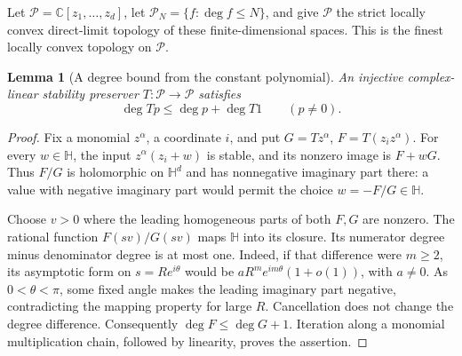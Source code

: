 \documentclass[reqno]{amsart}
\newtheorem{lemma}[theorem]{Lemma}
\theoremstyle{definition}
\theoremstyle{remark}
\newcommand{\C}{\mathbb C}
\newcommand{\HH}{\mathbb H}
\begin{document}
Let \(\mathcal P=\C[z_1,\ldots,z_d]\), let
\(\mathcal P_N=\{f:\deg f\le N\}\), and give \(\mathcal P\) the strict
locally convex direct-limit topology of these finite-dimensional spaces.
This is the finest locally convex topology on \(\mathcal P\).

\begin{lemma}[A degree bound from the constant polynomial]
\label{ana:degree-defect}
An injective complex-linear stability preserver
\(T:\mathcal P\to\mathcal P\) satisfies
\[
 \deg Tp\le\deg p+\deg T1\qquad(p\ne0).
\]
\end{lemma}
\begin{proof}
Fix a monomial \(z^\alpha\), a coordinate \(i\), and put
\(G=Tz^\alpha\), \(F=T(z_i z^\alpha)\).  For every \(w\in\HH\),
the input \(z^\alpha(z_i+w)\) is stable, and its nonzero image is
\(F+wG\).  Thus \(F/G\) is holomorphic on \(\HH^d\) and has nonnegative
imaginary part there: a value with negative imaginary part would permit
the choice \(w=-F/G\in\HH\).

Choose \(v>0\) where the leading homogeneous parts of both \(F,G\)
are nonzero.  The rational function \(F(sv)/G(sv)\) maps \(\HH\) into
its closure.  Its numerator degree minus denominator degree is at most
one.  Indeed, if that difference were \(m\ge2\), its asymptotic form
on \(s=Re^{i\theta}\) would be \(aR^m e^{im\theta}(1+o(1))\),
with \(a\ne0\).  As \(0<\theta<\pi\), some fixed angle makes the leading
imaginary part negative, contradicting the mapping property for large
\(R\).  Cancellation does not change the degree difference.
Consequently \(\deg F\le\deg G+1\).  Iteration along a monomial
multiplication chain, followed by linearity, proves the assertion.
\end{proof}
\end{document}
